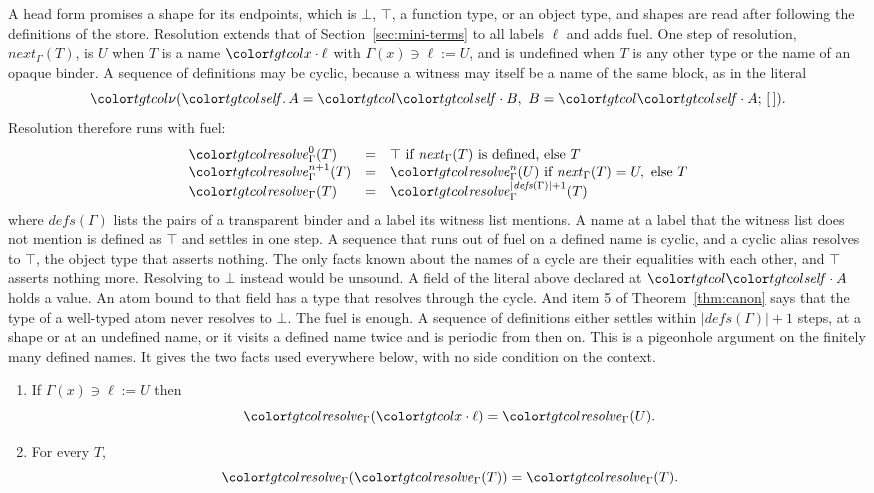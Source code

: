 A head form promises a shape for its endpoints, which is $\bot$, $\top$, a function type, or an object type, and shapes are read after following the definitions of the store. Resolution extends that of Section~\ref{sec:mini-terms} to all labels $\ell$ and adds fuel. One step of resolution, $\mathit{next}_\Gamma(T)$, is $U$ when $T$ is a name $\sel{x}{\ell}$ with $\Gamma(x) \ni \ell \mathrel{:=} U$, and is undefined when $T$ is any other type or the name of an opaque binder. A sequence of definitions may be cyclic, because a witness may itself be a name of the same block, as in the literal
\[
\lit{A = \sel{\self}{B},\ B = \sel{\self}{A}}{\tnil} .
\]
Resolution therefore runs with fuel:
\[
\begin{array}{@{}lcl@{}}
\resolven{\Gamma}{0}{T} & = & \top \text{ if } \mathit{next}_\Gamma(T) \text{ is defined, else } T \\
\resolven{\Gamma}{n+1}{T} & = & \resolven{\Gamma}{n}{U} \text{ if } \mathit{next}_\Gamma(T) = U, \text{ else } T \\
\resolve{\Gamma}{T} & = & \resolven{\Gamma}{|\mathit{defs}(\Gamma)| + 1}{T}
\end{array}
\]
where $\mathit{defs}(\Gamma)$ lists the pairs of a transparent binder and a label its witness list mentions. A name at a label that the witness list does not mention is defined as $\top$ and settles in one step. A sequence that runs out of fuel on a defined name is cyclic, and a cyclic alias resolves to $\top$, the object type that asserts nothing. The only facts known about the names of a cycle are their equalities with each other, and $\top$ asserts nothing more. Resolving to $\bot$ instead would be unsound. A field of the literal above declared at $\sel{\self}{A}$ holds a value. An atom bound to that field has a type that resolves through the cycle. And item 5 of Theorem~\ref{thm:canon} says that the type of a well-typed atom never resolves to $\bot$. The fuel is enough. A sequence of definitions either settles within $|\mathit{defs}(\Gamma)| + 1$ steps, at a shape or at an undefined name, or it visits a defined name twice and is periodic from then on. This is a pigeonhole argument on the finitely many defined names. It gives the two facts used everywhere below, with no side condition on the context.

\begin{lemma}[Resolution]\label{lem:resolve}
\begin{enumerate}
\item If $\Gamma(x) \ni \ell \mathrel{:=} U$ then
\[ \resolve{\Gamma}{\sel{x}{\ell}} = \resolve{\Gamma}{U} . \]
\item For every $T$,
\[ \resolve{\Gamma}{\resolve{\Gamma}{T}} = \resolve{\Gamma}{T} . \]
\end{enumerate}
\end{lemma}

